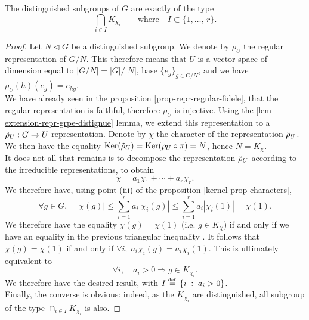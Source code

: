 \begin{prop}
The distinguished subgroups of $ G $ are exactly of the type
\begin{equation*}
\bigcap_{i \in I}{K_{\chi_i}} \quad \quad \text{where} \quad I \subset \{1, \ldots, \, r\}.
\end{equation*}
\end{prop}
\begin{proof}
Let $ N \lhd G $ be a distinguished subgroup. We denote by $ \rho_U $ the regular representation of $ G / N $. This therefore means that $ U $ is a vector space of dimension equal to $ | G / N | = |G| / | N | $, base $ \{e_g\}_{g \in G / N} $, and we have $ \rho_U (h) (e_g) = e_{hg} $. \\We have already seen in the proposition \ref{prop-repr-regular-fidele}, that the regular representation is faithful, therefore $ \rho_U $ is injective. Using the \ref{lem-extension-repr-grpe-distignue} lemma, we extend this representation to a $ \tilde{\rho}_U: G \rightarrow U $ representation. Denote by $ \chi $ the character of the representation $ \tilde{\rho}_U $. We then have the equality $ \operatorname{Ker} (\tilde{\rho}_U) = \operatorname{Ker} (\rho_U \circ \pi) = N $, hence $ N = K_{\chi} $. \\It does not all that remains is to decompose the representation $ \tilde{\rho}_U $ according to the irreducible representations, to obtain
\begin{equation*}
\chi = a_1 \chi_1 + \cdots + a_r \chi_r.
\end{equation*}
We therefore have, using point (iii) of the proposition \ref{kernel-prop-characters},
\begin{equation*}
\forall g \in G, \quad | \chi (g) | \leq \sum_{i = 1}^r{a_i | \chi_i (g) |} \leq \sum_{i = 1}^r{a_i | \chi_i (1) |} = \chi (1).
\end{equation*}
We therefore have the equality $ \chi (g) = \chi (1) $ (i.e. $ g \in K_\chi $) if and only if we have an equality in the previous triangular inequality . It follows that $ \chi (g) = \chi (1) $ if and only if $ \forall i, \; a_i \chi_i (g) = a_i \chi_i (1) $. This is ultimately equivalent to
\begin{equation*}
\forall i, \quad a_i> 0 \Longrightarrow g \in K_{\chi_i}.
\end{equation*}
We therefore have the desired result, with $ I \stackrel{\mbox{\upshape\tiny def.}}{=} \left\{ i \;:\; a_i> 0 \right\} $. \\Finally, the converse is obvious: indeed, as the $ K_{\chi_i} $ are distinguished, all subgroup of the type $ \cap_{i \in I}{K_{\chi_i}} $ is also.
\end{proof}
 
